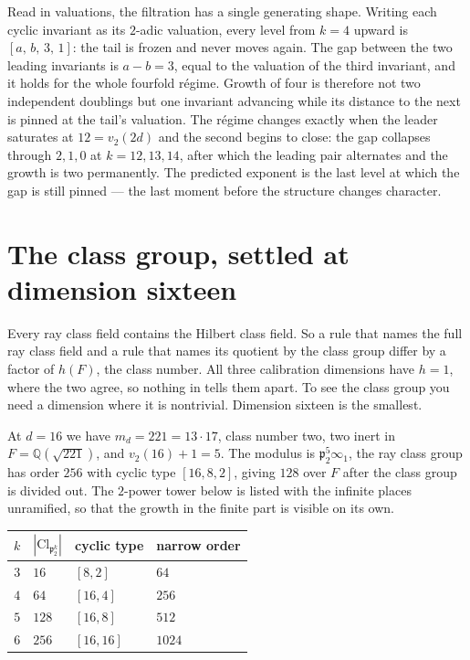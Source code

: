 \documentclass[12pt,a4paper]{article}
\newcommand{\Fd}{F}
\newcommand{\md}{m_d}
\newcommand{\pt}{\mathfrak{p}_2}
\newcommand{\Cl}{\mathrm{Cl}}
\begin{document}
Read in valuations, the filtration has a single generating shape. Writing each cyclic invariant as its $2$-adic valuation, every level from $k=4$ upward is $[a,\,b,\,3,\,1]$: the tail is frozen and never moves again. The gap between the two leading invariants is $a-b=3$, equal to the valuation of the third invariant, and it holds for the whole fourfold r\'egime. Growth of four is therefore not two independent doublings but one invariant advancing while its distance to the next is pinned at the tail's valuation. The r\'egime changes exactly when the leader saturates at $12 = v_2(2d)$ and the second begins to close: the gap collapses through $2,1,0$ at $k=12,13,14$, after which the leading pair alternates and the growth is two permanently. The predicted exponent is the last level at which the gap is still pinned — the last moment before the structure changes character.

\section{The class group, settled at dimension sixteen}
\label{sec:classgroup}

Every ray class field contains the Hilbert class field. So a rule that names the full ray class field and a rule that names its quotient by the class group differ by a factor of $h(\Fd)$, the class number. All three calibration dimensions have $h=1$, where the two agree, so nothing in  tells them apart. To see the class group you need a dimension where it is nontrivial. Dimension sixteen is the smallest.

At $d=16$ we have $\md = 221 = 13\cdot 17$, class number two, two inert in $\Fd = \mathbb{Q}(\sqrt{221})$, and $v_2(16)+1 = 5$. The modulus is $\pt^5\infty_1$, the ray class group has order $256$ with cyclic type $[16,8,2]$, giving $128$ over $\Fd$ after the class group is divided out. The $2$-power tower below is listed with the infinite places unramified, so that the growth in the finite part is visible on its own.

\begin{center}
\begin{tabular}{@{}clll@{}}
\toprule
$k$ & $|\Cl_{\pt^k}|$ & cyclic type & narrow order \\
\midrule
$3$ & $16$  & $[8,2]$   & $64$ \\
$4$ & $64$  & $[16,4]$  & $256$ \\
$5$ & $128$ & $[16,8]$  & $512$ \\
$6$ & $256$ & $[16,16]$ & $1024$ \\
\bottomrule
\end{tabular}
\end{center}
\end{document}

